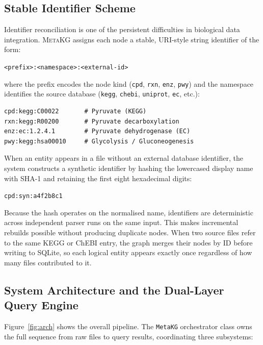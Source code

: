 \documentclass[10pt]{article}
\begin{document}
\subsection{Stable Identifier Scheme}

Identifier reconciliation is one of the persistent difficulties in biological
data integration. \textsc{MetaKG} assigns each node a stable, URI-style
string identifier of the form:

\begin{center}
\texttt{<prefix>:<namespace>:<external-id>}
\end{center}

\noindent where the prefix encodes the node kind (\texttt{cpd}, \texttt{rxn},
\texttt{enz}, \texttt{pwy}) and the namespace identifies the source database
(\texttt{kegg}, \texttt{chebi}, \texttt{uniprot}, \texttt{ec}, etc.):

\begin{lstlisting}[style=python, caption={Examples of stable node identifiers.}]
cpd:kegg:C00022       # Pyruvate (KEGG)
rxn:kegg:R00200       # Pyruvate decarboxylation
enz:ec:1.2.4.1        # Pyruvate dehydrogenase (EC)
pwy:kegg:hsa00010     # Glycolysis / Gluconeogenesis
\end{lstlisting}

When an entity appears in a file without an external database identifier, the
system constructs a synthetic identifier by hashing the lowercased display name
with SHA-1 and retaining the first eight hexadecimal digits:

\begin{center}
\texttt{cpd:syn:a4f2b8c1}
\end{center}

Because the hash operates on the normalised name, identifiers are
deterministic across independent parser runs on the same input. This makes
incremental rebuilds possible without producing duplicate nodes. When two
source files refer to the same KEGG or ChEBI entry, the graph merges their
nodes by ID before writing to SQLite, so each logical entity appears exactly
once regardless of how many files contributed to it.

\subsection{System Architecture and the Dual-Layer Query Engine}

Figure~\ref{fig:arch} shows the overall pipeline. The \texttt{MetaKG}
orchestrator class owns the full sequence from raw files to query results,
coordinating three subsystems:
\end{document}
